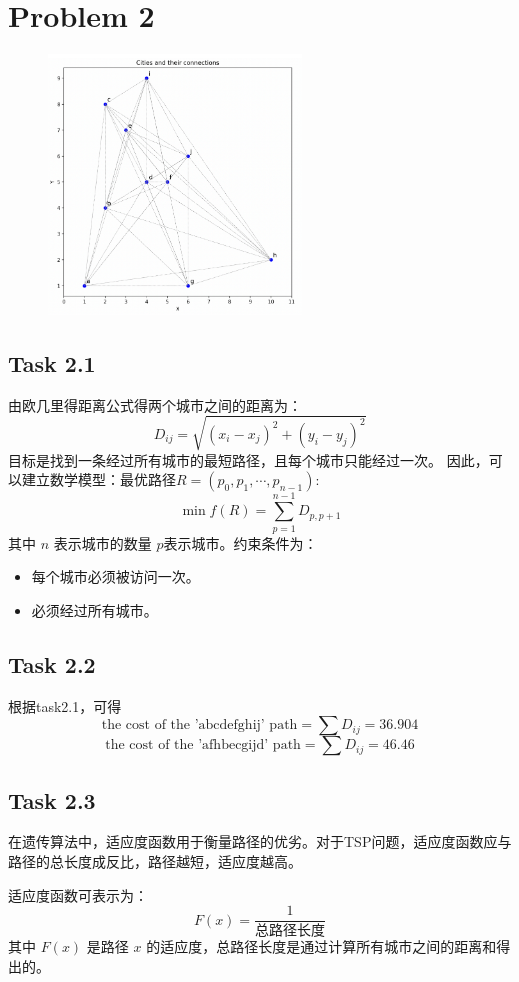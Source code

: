 \documentclass[onecolumn,oneside]{SUSTechHomework}
\begin{document}
    \section*{Problem 2}
    \begin{figure}[h]
        \centering
        \includegraphics[width=0.6\textwidth]{task2.png} %
        \label{fig:example} %
    \end{figure}

    \subsection*{Task 2.1}
    由欧几里得距离公式得两个城市之间的距离为：
    \[ D_{ij} = \sqrt{(x_i - x_j)^2 + (y_i - y_j)^2} \]
    目标是找到一条经过所有城市的最短路径，且每个城市只能经过一次。
    因此，可以建立数学模型：最优路径\(R = (p_0, p_1, \cdots, p_{n-1})\): 
    \[\min f(R) = \sum_{p = 1}^{n - 1} D_{p, p+1}\]
    其中 \( n \) 表示城市的数量 \( p \)表示城市。约束条件为：
    \begin{itemize}
        \item 每个城市必须被访问一次。
        \item 必须经过所有城市。
    \end{itemize}

    \subsection*{Task 2.2}
    根据task2.1，可得\[ \text{the cost of the 'abcdefghij' path} = \sum D_{ij} = 36.904 \]
    \[ \text{the cost of the 'afhbecgijd' path} = \sum D_{ij} = 46.46 \]

    \subsection*{Task 2.3}
    在遗传算法中，适应度函数用于衡量路径的优劣。对于TSP问题，适应度函数应与路径的总长度成反比，路径越短，适应度越高。

    适应度函数可表示为：
    \[
    F(x) = \frac{1}{\text{总路径长度}}
    \]
    其中 \( F(x) \) 是路径 \( x \) 的适应度，总路径长度是通过计算所有城市之间的距离和得出的。
\end{document}
